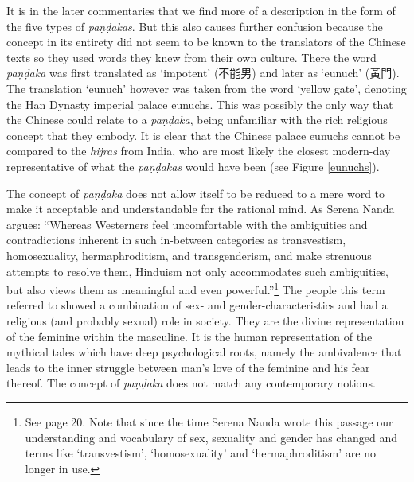 It is in the later commentaries that we find more of a description in the form of the five types of {\em paṇḍakas}. But this also causes further confusion because the concept in its entirety did not seem to be known to the translators of the Chinese texts so they used words they knew from their own culture. There the word {\em paṇḍaka} was first translated as `impotent' (不能男) and later as `eunuch' (黃門). The translation `eunuch' however was taken from the word `yellow gate', denoting the Han Dynasty imperial palace eunuchs. This was possibly the only way that the Chinese could relate to a {\em paṇḍaka}, being unfamiliar with the rich religious concept that they embody. It is clear that the Chinese palace eunuchs cannot be compared to the {\em hijras} from India, who are most likely the closest modern-day representative of what the {\em paṇḍakas} would have been (see Figure \ref{eunuchs}).

The concept of {\em paṇḍaka} does not allow itself to be reduced to a mere word to make it acceptable and understandable for the rational mind. As Serena Nanda argues: ``Whereas Westerners feel uncomfortable with the ambiguities and contradictions inherent in such in-between categories as transvestism, homosexuality, hermaphroditism, and transgenderism, and make strenuous attempts to resolve them, Hinduism not only accommodates such ambiguities, but also views them as meaningful and even powerful.''\footnote{See \cite{nanda} page 20. Note that since the time Serena Nanda wrote this passage our understanding and vocabulary of sex, sexuality and gender has changed and terms like `transvestism', `homosexuality' and `hermaphroditism' are no longer in use.} The people this term referred to showed a combination of sex- and gender-characteristics and had a religious (and probably sexual) role in society. They are the divine representation of the feminine within the masculine. It is the human representation of the mythical tales which have deep psychological roots, namely the ambivalence that leads to the inner struggle between man's love of the feminine and his fear thereof. The concept of {\em paṇḍaka} does not match any contemporary notions. 
